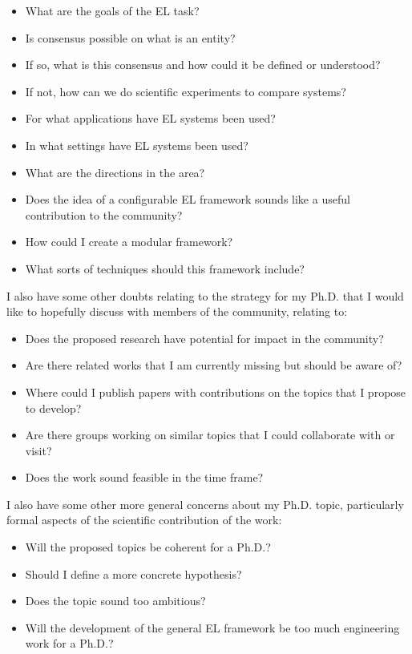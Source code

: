 \documentclass[sigconf]{acmart}
\begin{document}
\begin{itemize}
\item What are the goals of the EL task?
\item Is consensus possible on what is an entity?
\item If so, what is this consensus and how could it be defined or understood?
\item If not, how can we do scientific experiments to compare systems?
\item For what applications have EL systems been used?
\item In what settings have EL systems been used?
\item What are the directions in the area?
\item Does the idea of a configurable EL framework sounds like a useful contribution to the community?
\item How could I create a modular framework?
\item What sorts of techniques should this framework include?
\end{itemize}

I also have some other doubts relating to the strategy for my Ph.D. that I would like to hopefully discuss with members of the community, relating to:

\begin{itemize}
\item Does the proposed research have potential for impact in the community?
\item Are there related works that I am currently missing but should be aware of?
\item Where could I publish papers with contributions on the topics that I propose to develop?
\item Are there groups working on similar topics that I could collaborate with or visit?
\item Does the work sound feasible in the time frame?
\end{itemize}

I also have some other more general concerns about my Ph.D. topic, particularly formal aspects of the scientific contribution of the work:



\begin{itemize}
\item Will the proposed topics be coherent for a Ph.D.?
\item Should I define a more concrete hypothesis?
\item Does the topic sound too ambitious?
\item Will the development of the general EL framework be too much engineering work for a Ph.D.?
\end{itemize}
\end{document}
